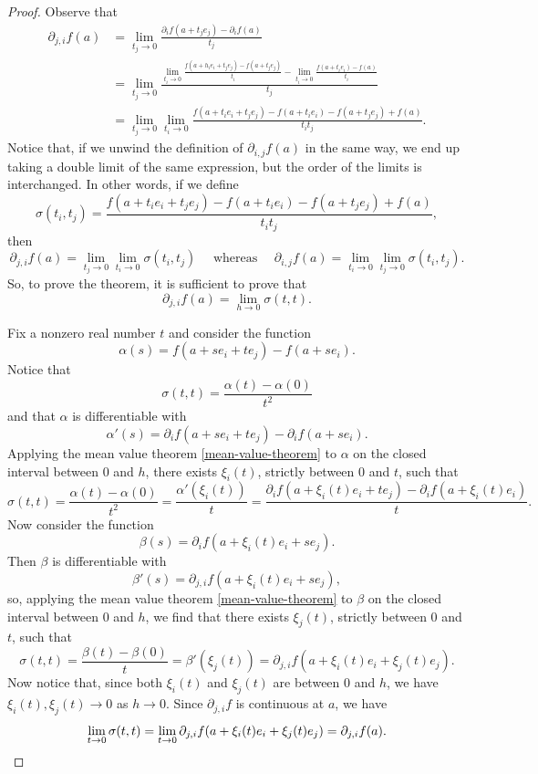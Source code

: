 \begin{proof}
	Observe that
	\[ \begin{aligned} \partial_{j,i} f(a) &= \lim_{t_j \to 0} \frac{\partial_i f(a + t_j e_j) - \partial_i f(a)}{t_j} \\
	&= \lim_{t_j \to 0} \frac{ \displaystyle \lim_{t_i \to 0} \frac{f(a + h_i e_i + t_j e_j) - f(a + t_j e_j)}{t_i} - \lim_{t_i \to  0} \frac{f(a + t_i e_i) - f(a)}{t_i} }{t_j} \\
	&= \lim_{t_j \to 0} \lim_{t_i \to 0} \frac{f(a + t_i e_i + t_j e_j) - f(a+t_i e_i) - f(a + t_j e_j) + f(a)}{t_i t_j}. \end{aligned} \]
	Notice that, if we unwind the definition of $\partial_{i,j} f(a)$ in the same way, we end up taking a double limit of the same expression, but the order of the limits is interchanged. In other words, if we define
	\[ \sigma(t_i, t_j) = \frac{f(a + t_i e_i + t_j e_j) - f(a+t_i e_i) - f(a + t_j e_j) + f(a)}{t_i t_j},  \]
	then
	\[ \partial_{j,i} f(a) = \lim_{t_j \to 0} \lim_{t_i \to 0} \sigma(t_i, t_j) \quad \text{ whereas } \quad \partial_{i,j}f(a) = \lim_{t_i \to 0} \lim_{t_j \to 0} \sigma(t_i, t_j). \]
	So, to prove the theorem, it is sufficient to prove that
	\[ \partial_{j,i} f(a) = \lim_{h \to 0} \sigma(t,t). \]
	
	Fix a nonzero real number $t$ and consider the function
	\[ \alpha(s) = f(a + se_i + te_j) - f(a + se_i). \]
	Notice that
	\[ \sigma(t,t) = \frac{\alpha(t)-\alpha(0)}{t^2} \]
	and that $\alpha$ is differentiable with \[ \alpha'(s) = \partial_i f(a + se_i + te_j) - \partial_i f(a + se_i). \]
	Applying the mean value theorem \ref{mean-value-theorem} to $\alpha$ on the closed interval between 0 and $h$, there exists $\xi_i(t)$, strictly between 0 and $t$, such that
	\[ \sigma(t,t) = \frac{\alpha(t) - \alpha(0)}{t^2} = \frac{\alpha'(\xi_i(t))}{t} = \frac{\partial_i f(a + \xi_i(t) e_i + te_j) - \partial_i f(a + \xi_i(t) e_i)}{t}. \]
	Now consider the function 
	\[ \beta(s) = \partial_i f(a + \xi_i(t) e_i + se_j). \]
	Then $\beta$ is differentiable with
	\[ \beta'(s) = \partial_{j,i} f(a + \xi_i(t) e_i + se_j), \]
	so, applying the mean value theorem \ref{mean-value-theorem} to $\beta$ on the closed interval between 0 and $h$, we find that there exists $\xi_j(t)$, strictly between 0 and $t$, such that
	\[ \sigma(t,t) = \frac{\beta(t) - \beta(0)}{t} = \beta'(\xi_j(t)) = \partial_{j,i} f(a + \xi_i(t) e_i + \xi_j(t) e_j). \]
	Now notice that, since both $\xi_i(t)$ and $\xi_j(t)$ are between 0 and $h$, we have $\xi_i(t), \xi_j(t) \to 0$ as $h \to 0$. Since $\partial_{j,i} f$ is continuous at $a$, we have
	\[ \lim_{t \to 0} \sigma(t,t) = \lim_{t \to 0} \partial_{j,i} f (a + \xi_i(t)e_i + \xi_j(t)e_j) = \partial_{j,i} f(a). \qedhere \]
\end{proof}

